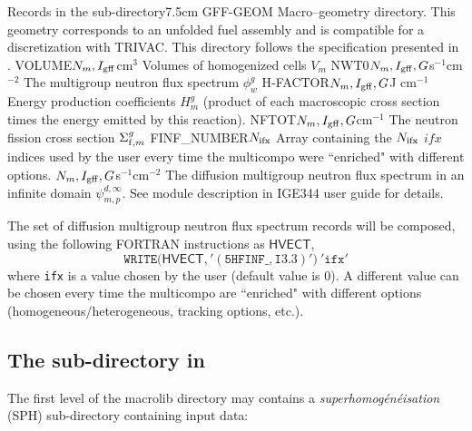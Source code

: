 \begin{DescriptionEnregistrement}{Records in the  sub-directory}{7.5cm}
\DirEnr
  {GFF-GEOM}
  {Macro--geometry directory. This geometry corresponds to an unfolded fuel assembly and is compatible
  for a discretization with TRIVAC. This directory follows the specification presented in .}
\RealEnr
  {VOLUME}{$N_{m},I_{\rm gff}$}{cm$^{3}$}
  {Volumes of homogenized cells $V_{m}$}
\RealEnr
  {NWT0}{$N_{m},I_{\rm gff},G$}{s$^{-1}$cm$^{-2}$}
  {The multigroup neutron flux spectrum $\phi_{w}^{g}$} 
\RealEnr
  {H-FACTOR}{$N_{m},I_{\rm gff},G$}{J cm$^{-1}$}  
  {Energy production coefficients $H_{m}^{g}$ (product of each macroscopic cross section
  times the energy emitted by this reaction).}
\RealEnr
  {NFTOT}{$N_{m},I_{\rm gff},G$}{cm$^{-1}$}
  {The neutron fission cross section $\Sigma_{{\rm f},m}^{g}$}
\IntEnr
  {FINF\_NUMBER}{$N_{\rm ifx}$}
  {Array containing the $N_{\rm ifx}$ $ifx$ indices used by the user every time the multicompo were ``enriched"
  with different options.}
\RealEnr
  {}{$N_{m},I_{\rm gff},G$}{s$^{-1}$cm$^{-2}$} 
  {The diffusion multigroup neutron flux spectrum in an infinite domain $\psi_{m,p}^{d,\infty}$. See
   module description in IGE344 user guide for details.}
\end{DescriptionEnregistrement}

The set of diffusion multigroup neutron flux spectrum records  will be
composed, using the following FORTRAN instructions as $\mathsf{HVECT}$,
  \begin{displaymath}
    \mathtt{WRITE(}\mathsf{HVECT}\mathtt{,'(5HFINF\_,I3.3)')} \ \mathtt{'ifx'}
  \end{displaymath}
where {\tt ifx} is a value chosen by the user (default value is 0). A different value can be chosen every time the multicompo
are ``enriched" with different options (homogeneous/heterogeneous, tracking options, etc.).

\clearpage

\subsection{The  sub-directory in }\label{sect:macroSPH}

The first level of the macrolib directory may contains a {\sl superhomog\'en\'eisation} (SPH) sub-directory 
containing input data:


